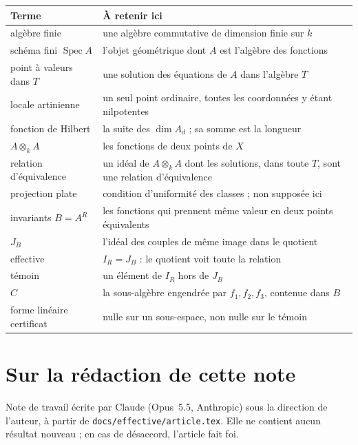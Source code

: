 \documentclass[11pt,a4paper]{amsart}
\theoremstyle{definition}
\theoremstyle{plain}
\theoremstyle{remark}
\newcommand{\Spec}{\operatorname{Spec}}
\begin{document}
\begin{tabular}{@{}p{3.6cm}p{10.2cm}@{}}
\toprule
Terme & À retenir ici \\
\midrule
algèbre finie & une algèbre commutative de dimension finie sur $k$ \\
schéma fini $\Spec A$ & l'objet géométrique dont $A$ est l'algèbre des fonctions \\
point à valeurs dans $T$ & une solution des équations de $A$ dans l'algèbre $T$ \\
locale artinienne & un seul point ordinaire, toutes les coordonnées y étant nilpotentes \\[2pt]
fonction de Hilbert & la suite des $\dim A_d$ ; sa somme est la longueur \\
$A \otimes_k A$ & les fonctions de deux points de $X$ \\
relation d'équivalence & un idéal de $A \otimes_k A$ dont les solutions, dans toute $T$, sont une relation d'équivalence \\[2pt]
projection plate & condition d'uniformité des classes ; non supposée ici \\
invariants $B = A^R$ & les fonctions qui prennent même valeur en deux points équivalents \\[2pt]
$J_B$ & l'idéal des couples de même image dans le quotient \\
effective & $I_R = J_B$ : le quotient voit toute la relation \\
témoin & un élément de $I_R$ hors de $J_B$ \\
$C$ & la sous-algèbre engendrée par $f_1, f_2, f_3$, contenue dans $B$ \\
forme linéaire certificat & nulle sur un sous-espace, non nulle sur le témoin \\
\bottomrule
\end{tabular}

\section*{Sur la rédaction de cette note}

Note de travail écrite par Claude (Opus~5.5, Anthropic) sous la direction de l'auteur, à partir de \texttt{docs/effective/article.tex}. Elle ne contient aucun résultat nouveau ; en cas de désaccord, l'article fait foi.
\end{document}
